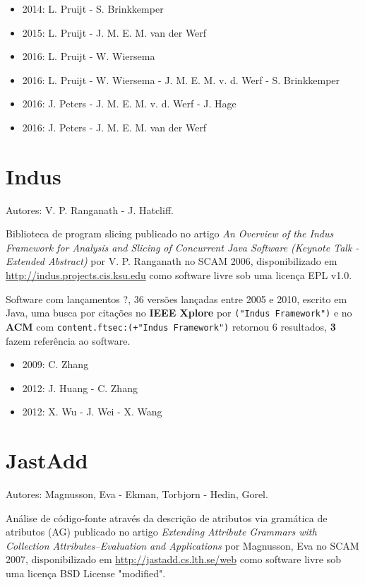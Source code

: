 \begin{itemize}
\item 2014: L. Pruijt - S. Brinkkemper
\item 2015: L. Pruijt - J. M. E. M. van der Werf
\item 2016: L. Pruijt - W. Wiersema
\item 2016: L. Pruijt - W. Wiersema - J. M. E. M. v. d. Werf - S. Brinkkemper
\item 2016: J. Peters - J. M. E. M. v. d. Werf - J. Hage
\item 2016: J. Peters - J. M. E. M. van der Werf
\end{itemize}

\section{Indus}

Autores:
V. P. Ranganath - J. Hatcliff.

Biblioteca de program slicing
publicado no artigo {\it An Overview of the Indus Framework for Analysis and Slicing of Concurrent Java Software (Keynote Talk - Extended Abstract)}
por V. P. Ranganath
no SCAM 2006,
disponibilizado em \url{http://indus.projects.cis.ksu.edu}
como software livre
sob uma licença EPL v1.0.

Software com lançamentos ?,
36 versões lançadas
entre 2005 e 2010,
escrito em Java,
uma busca por citações no {\bf IEEE Xplore} por
\texttt{("Indus Framework")}
e no {\bf ACM} com
\texttt{content.ftsec:(+"Indus Framework")}
retornou
6 resultados,
{\bf 3} fazem referência ao software.

\begin{itemize}
\item 2009: C. Zhang
\item 2012: J. Huang - C. Zhang
\item 2012: X. Wu - J. Wei - X. Wang
\end{itemize}

\section{JastAdd}

Autores:
Magnusson, Eva - Ekman, Torbjorn - Hedin, Gorel.

Análise de código-fonte através da descrição de atributos via gramática de atributos (AG)
publicado no artigo {\it Extending Attribute Grammars with Collection Attributes--Evaluation and Applications}
por Magnusson, Eva
no SCAM 2007,
disponibilizado em \url{http://jastadd.cs.lth.se/web}
como software livre
sob uma licença BSD License "modified".

